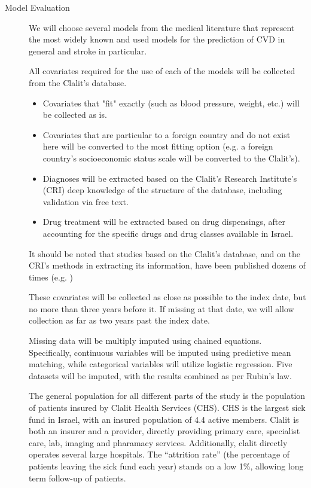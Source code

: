 \documentclass[a4paper,12pt]{article}
\begin{document}
	\begin{description}
		
		\item[Model Evaluation] We will choose several models from the medical literature that represent the most widely known and used models for the prediction of CVD in general and stroke in particular.
		
		All covariates required for the use of each of the models will be collected from the Clalit's database. 
		\begin{itemize}
			\item Covariates that "fit" exactly (such as blood pressure, weight, etc.) will be collected as is.
			\item Covariates that are particular to a foreign country and do not exist here will be converted to the most fitting option (e.g. a foreign country's socioeconomic status scale will be converted to the Clalit's).
			\item Diagnoses will be extracted based on the Clalit's Research Institute's (CRI) deep knowledge of the structure of the database, including validation via free text.
			\item Drug treatment will be extracted based on drug dispensings, after accounting for the specific drugs and drug classes available in Israel.
		\end{itemize}
		It should be noted that studies based on the Clalit's database, and on the CRI's methods in extracting its information, have been published dozens of times (e.g. \cite{Reges2018,Dagan2017})
	
		These covariates will be collected as close as possible to the index date, but no more than three years before it. If missing at that date, we will allow collection as far as two years past the index date.
		
		Missing data will be multiply imputed using chained equations. Specifically, continuous variables will be imputed using predictive mean matching, while categorical variables will utilize logistic regression\cite{Buuren2011}. Five datasets will be imputed, with the results combined as per Rubin's law\cite{Rubin1987}.
	
		The general population for all different parts of the study is the population of patients insured by Clalit Health Services (CHS). CHS is the largest sick fund in Israel, with an insured population of 4.4 active members. Clalit is both an insurer and a provider, directly providing primary care, specialist care, lab, imaging and pharamacy services. Additionally, clalit directly operates several large hospitals. The “attrition rate” (the percentage of patients leaving the sick fund each year) stands on a low 1\%, allowing long term follow-up of patients.
		

\end{description}
\end{document}
